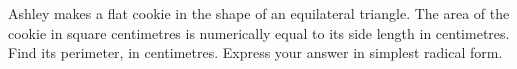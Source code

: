 Ashley makes a flat cookie in the shape of an equilateral triangle. The area of the cookie in square centimetres is numerically equal to its side length in centimetres. Find its perimeter, in centimetres. Express your answer in simplest radical form.
